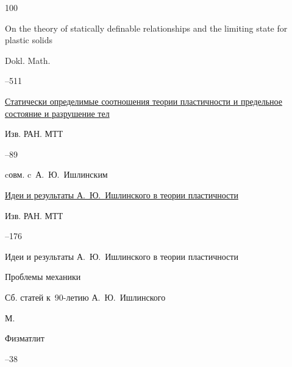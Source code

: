 \begin{thebibliography}{100}

\transl

\paper On the theory of statically definable relationships and the limiting state for plastic solids

\jour Dokl. Math.



--511








\paper \href{http://elibrary.ru/item.asp?id=17268740}{Статически определимые соотношения теории пластичности и предельное состояние и разрушение тел}

\jour Изв. РАН. МТТ



–89 

\miscnote cовм. c~А.~Ю.~Ишлинским





\paper \href{http://elibrary.ru/item.asp?id=17268764}{Идеи и результаты А.~Ю.~Ишлинского в теории пластичности}

\jour Изв. РАН. МТТ



–176


\morerref

\paper Идеи и результаты А.~Ю.~Ишлинского в теории пластичности 

\inbook Проблемы механики

\bookinfo Сб. статей к~90-летию А.~Ю.~Ишлинского

\publaddr М.

\publ Физматлит


–38







\end{thebibliography}
